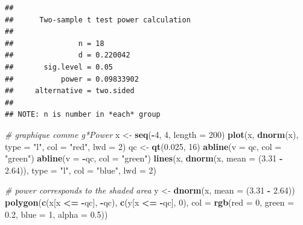 \documentclass[
  12pt,
]{book}
\newenvironment{Shaded}{\begin{snugshade}}{\end{snugshade}}
\newcommand{\CommentTok}[1]{\textcolor[rgb]{0.56,0.35,0.01}{\textit{#1}}}
\newcommand{\DataTypeTok}[1]{\textcolor[rgb]{0.13,0.29,0.53}{#1}}
\newcommand{\DecValTok}[1]{\textcolor[rgb]{0.00,0.00,0.81}{#1}}
\newcommand{\FloatTok}[1]{\textcolor[rgb]{0.00,0.00,0.81}{#1}}
\newcommand{\KeywordTok}[1]{\textcolor[rgb]{0.13,0.29,0.53}{\textbf{#1}}}
\newcommand{\NormalTok}[1]{#1}
\newcommand{\OperatorTok}[1]{\textcolor[rgb]{0.81,0.36,0.00}{\textbf{#1}}}
\newcommand{\StringTok}[1]{\textcolor[rgb]{0.31,0.60,0.02}{#1}}
\begin{document}
\begin{verbatim}
## 
##      Two-sample t test power calculation 
## 
##               n = 18
##               d = 0.220042
##       sig.level = 0.05
##           power = 0.09833902
##     alternative = two.sided
## 
## NOTE: n is number in *each* group
\end{verbatim}

\begin{Shaded}
\begin{Highlighting}[]
\CommentTok{\# graphique comme g*Power}
\NormalTok{x \textless{}{-}}\StringTok{ }\KeywordTok{seq}\NormalTok{(}\OperatorTok{{-}}\DecValTok{4}\NormalTok{, }\DecValTok{4}\NormalTok{, }\DataTypeTok{length =} \DecValTok{200}\NormalTok{)}
\KeywordTok{plot}\NormalTok{(x, }\KeywordTok{dnorm}\NormalTok{(x), }\DataTypeTok{type =} \StringTok{"l"}\NormalTok{, }\DataTypeTok{col =} \StringTok{"red"}\NormalTok{, }\DataTypeTok{lwd =} \DecValTok{2}\NormalTok{)}
\NormalTok{qc \textless{}{-}}\StringTok{ }\KeywordTok{qt}\NormalTok{(}\FloatTok{0.025}\NormalTok{, }\DecValTok{16}\NormalTok{)}
\KeywordTok{abline}\NormalTok{(}\DataTypeTok{v =}\NormalTok{ qc, }\DataTypeTok{col =} \StringTok{"green"}\NormalTok{)}
\KeywordTok{abline}\NormalTok{(}\DataTypeTok{v =} \OperatorTok{{-}}\NormalTok{qc, }\DataTypeTok{col =} \StringTok{"green"}\NormalTok{)}
\KeywordTok{lines}\NormalTok{(x, }\KeywordTok{dnorm}\NormalTok{(x, }\DataTypeTok{mean =}\NormalTok{ (}\FloatTok{3.31} \OperatorTok{{-}}\StringTok{ }\FloatTok{2.64}\NormalTok{)), }\DataTypeTok{type =} \StringTok{"l"}\NormalTok{, }\DataTypeTok{col =} \StringTok{"blue"}\NormalTok{, }\DataTypeTok{lwd =} \DecValTok{2}\NormalTok{)}

\CommentTok{\# power corresponds to the shaded area}
\NormalTok{y \textless{}{-}}\StringTok{ }\KeywordTok{dnorm}\NormalTok{(x, }\DataTypeTok{mean =}\NormalTok{ (}\FloatTok{3.31} \OperatorTok{{-}}\StringTok{ }\FloatTok{2.64}\NormalTok{))}
\KeywordTok{polygon}\NormalTok{(}\KeywordTok{c}\NormalTok{(x[x }\OperatorTok{\textless{}=}\StringTok{ }\OperatorTok{{-}}\NormalTok{qc], }\OperatorTok{{-}}\NormalTok{qc), }\KeywordTok{c}\NormalTok{(y[x }\OperatorTok{\textless{}=}\StringTok{ }\OperatorTok{{-}}\NormalTok{qc], }\DecValTok{0}\NormalTok{), }\DataTypeTok{col =} \KeywordTok{rgb}\NormalTok{(}\DataTypeTok{red =} \DecValTok{0}\NormalTok{, }\DataTypeTok{green =} \FloatTok{0.2}\NormalTok{, }\DataTypeTok{blue =} \DecValTok{1}\NormalTok{, }\DataTypeTok{alpha =} \FloatTok{0.5}\NormalTok{))}
\end{Highlighting}
\end{Shaded}
\end{document}
